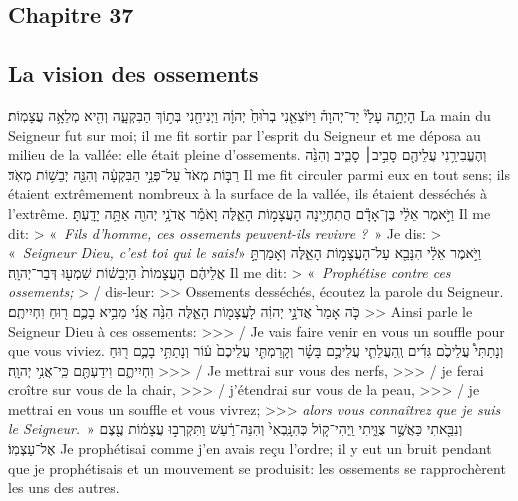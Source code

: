 \begin{paracol}[1]
  \section*{Chapitre 37}
  \subsection*{La vision des ossements}
  \verset
  {הָיְתָ֣ה עָלַי֘ יַד־יְהוָה֒
    וַיּוֹצִאֵ֤נִי בְר֙וּחַ֙ יְהוָ֔ה
    וַיְנִיחֵ֖נִי בְּת֣וֹךְ הַבִּקְעָ֑ה
    וְהִ֖יא מְלֵאָ֥ה עֲצָמֽוֹת׃}
  {La main du Seigneur fut sur moi;
    il me fit sortir par l’esprit du Seigneur
    et me déposa au milieu de la vallée:
    elle était pleine d’ossements.}
  \verset
  {וְהֶעֱבִירַ֥נִי עֲלֵיהֶ֖ם סָבִ֣יב׀ סָבִ֑יב
    וְהִנֵּ֙ה רַבּ֤וֹת מְאֹד֙ עַל־פְּנֵ֣י הַבִּקְעָ֔ה
    וְהִנֵּ֖ה יְבֵשׁ֥וֹת מְאֹֽד׃}
  {Il me fit circuler parmi eux en tout sens;
    ils étaient extrêmement nombreux à la surface de la vallée,
    ils étaient desséchés à l'extrême.}
  \verseSpace
  \verset
  {וַיֹּ֣אמֶר אֵלַ֔י
    בֶּן־אָדָ֕ם הֲתִחְיֶ֖ינָה הָעֲצָמ֣וֹת הָאֵ֑לֶּה
    וָאֹמַ֕ר
    אֲדֹנָ֥י יְהוִ֖ה אַתָּ֥ה יָדָֽעְתָּ׃}
  {Il me dit:
    > «~\textit{Fils d’homme, ces ossements peuvent-ils revivre ?}~»
    Je dis:
    > «~\textit{Seigneur Dieu, c’est toi qui le sais!}»}
  \verset
  {וַיֹּ֣אמֶר אֵלַ֔י
    הִנָּבֵ֖א עַל־הָעֲצָמ֣וֹת הָאֵ֑לֶּה
    וְאָמַרְתָּ֣ אֲלֵיהֶ֔ם
    הָעֲצָמוֹת֙ הַיְבֵשׁ֔וֹת שִׁמְע֖וּ דְּבַר־יְהוָֽה׃}
  {Il me dit:
    > «~\textit{Prophétise contre ces ossements;}
    > / dis-leur:
    >> Ossements desséchés, écoutez la parole du Seigneur.}
  \verset
  {כֹּ֤ה אָמַר֙ אֲדֹנָ֣י יְהוִ֔ה לָעֲצָמ֖וֹת הָאֵ֑לֶּה
    הִנֵּ֙ה אֲנִ֜י מֵבִ֥יא בָכֶ֛ם ר֖וּחַ וִחְיִיתֶֽם׃}
  {>> Ainsi parle le Seigneur Dieu à ces ossements:
    >>> / Je vais faire venir en vous un souffle pour que vous viviez.}
  \verset
  {וְנָתַתִּי֩ עֲלֵיכֶ֙ם גִּדִ֜ים
    וְֽהַעֲלֵתִ֧י עֲלֵיכֶ֣ם בָּשָׂ֗ר
    וְקָרַמְתִּ֤י עֲלֵיכֶם֙ ע֔וֹר
    וְנָתַתִּ֥י בָכֶ֛ם ר֖וּחַ וִחְיִיתֶ֑ם
    וִידַעְתֶּ֖ם כִּֽי־אֲנִ֥י יְהוָֽה׃}
  {>>> / Je mettrai sur vous des nerfs,
    >>> / je ferai croître sur vous de la chair,
    >>> / j’étendrai sur vous de la peau,
    >>> / je mettrai en vous un souffle et vous vivrez;
    >>> \textit{alors vous connaîtrez que je suis le Seigneur.}~»}
  \verset
  {וְנִבֵּ֖אתִי כַּאֲשֶׁ֣ר צֻוֵּ֑יתִי
    וַֽיְהִי־ק֤וֹל כְּהִנָּֽבְאִי֙
    וְהִנֵּה־רַ֔עַשׁ
    וַתִּקְרְב֣וּ עֲצָמ֔וֹת עֶ֖צֶם אֶל־עַצְמֽוֹ׃}
  {Je prophétisai comme j’en avais reçu l’ordre;
    il y eut un bruit pendant que je prophétisais
    et un mouvement se produisit:
    les ossements se rapprochèrent les uns des autres.}

\end{paracol}
